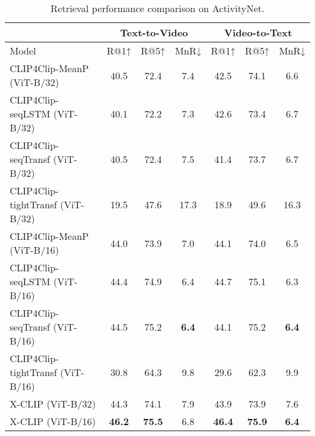 \documentclass[sigconf]{acmart}
\begin{document}
\begin{table*}[]
\caption{Retrieval performance comparison on ActivityNet.}
\begin{tabular}{l|ccc|ccc}
 \hline
           & \multicolumn{3}{c|}{Text-to-Video}            & \multicolumn{3}{c}{Video-to-Text}            \\ \hline
Model      & R@1↑          & R@5↑          & MnR↓         & R@1↑          & R@5↑          & MnR↓         \\ \hline
CLIP4Clip-MeanP (ViT-B/32)  & 40.5 & 72.4 & 7.4 & 42.5 & 74.1 & 6.6 \\
 CLIP4Clip-seqLSTM (ViT-B/32)     & 40.1 & 72.2 & 7.3  & 42.6 & 73.4 & 6.7  \\
 CLIP4Clip-seqTransf (ViT-B/32)    & 40.5 & 72.4 & 7.5  & 41.4 & 73.7 & 6.7  \\
 CLIP4Clip-tightTransf (ViT-B/32)   & 19.5 & 47.6 & 17.3 & 18.9 & 49.6 & 16.3 \\
CLIP4Clip-MeanP (ViT-B/16)  & 44.0   &  73.9    &  7.0   &   44.1   &  74.0    &   6.5  \\ 
CLIP4Clip-seqLSTM (ViT-B/16)  & 44.4 & 74.9 & 6.4 & 44.7 & 75.1 & 6.3  \\ 
CLIP4Clip-seqTransf (ViT-B/16)  & 44.5   &  75.2    &  \textbf{6.4}   &   44.1   &  75.2    &   \textbf{6.4} \\ 
CLIP4Clip-tightTransf (ViT-B/16)  & 30.8 & 64.3 & 9.8 & 29.6 & 62.3 & 9.9 \\ 
\hline
X-CLIP (ViT-B/32)    & 44.3 & 74.1 & 7.9 & 43.9 & 73.9 & 7.6 \\
X-CLIP (ViT-B/16)    & \textbf{46.2} & \textbf{75.5} & 6.8 & \textbf{46.4} & \textbf{75.9} & \textbf{6.4}     \\   \hline
\end{tabular}
\label{tab:acnet_performance2}
\end{table*}
\end{document}
